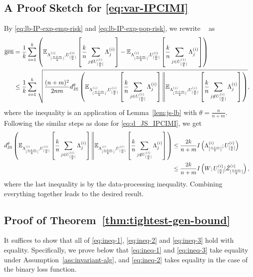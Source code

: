 \documentclass[onecolumn,romanappendices,10pt]{IEEEtran}
\newcommand{\EE}{{\mathbb{E}}}
\DeclareMathOperator{\gen}{\overline{gen}}
\begin{document}
	\subsection{A Proof Sketch for \eqref{eq:var-IPCIMI}} \label{subapp:var-IPCIMI}
	By \eqref{eq:lb-IP-exp-emp-risk} and \eqref{eq:lb-IP-exp-pop-risk}, we rewrite $\gen$ as
	\begin{equation}
		\begin{aligned}
			\gen &= \frac{1}{k} \sum_{i=1}^k \left( \EE_{\Lambda^{(i)}_{[\frac{n+m}{k}]}, U^{(i)}_{[\frac{n}{k}]}} \left[ \frac{k}{n} \sum_{j \not\in U^{(i)}_{[\frac{n}{k}]}} \Lambda^{(i)}_j \right] - \EE_{\Lambda^{(i)}_{[\frac{n+m}{k}]}, U^{(i)}_{[\frac{n}{k}]}} \left[ \frac{k}{n} \sum_{j \in U^{(i)}_{[\frac{n}{k}]}} \Lambda^{(i)}_j \right] \right) \\
			&\leq \frac{1}{k} \sum_{i=1}^k \sqrt{\frac{(n+m)^2}{2nm} d^\theta_{\textnormal{JS}} \left( \EE_{\Lambda^{(i)}_{[\frac{n+m}{k}]}, U^{(i)}_{[\frac{n}{k}]}} \left[ \frac{k}{n} \sum_{j \in U^{(i)}_{[\frac{n}{k}]}} \Lambda^{(i)}_j \right] \left\| \EE_{\Lambda^{(i)}_{[\frac{n+m}{k}]}, U^{(i)}_{[\frac{n}{k}]}} \left[ \frac{k}{n} \sum_{j \not\in U^{(i)}_{[\frac{n}{k}]}} \Lambda^{(i)}_j \right] \right. \right)},
		\end{aligned}
	\end{equation}
	where the inequality is an application of Lemma~\ref{lem:js-lb} with $\theta = \frac{n}{n+m}$. Following the similar steps as done for \eqref{eq:d_JS_IPCIMI}, we get
	\begin{equation}
		\begin{aligned}
			d^\theta_{\textnormal{JS}} \left( \EE_{\Lambda^{(i)}_{[\frac{n+m}{k}]}, U^{(i)}_{[\frac{n}{k}]}} \left[ \frac{k}{n} \sum_{j \in U^{(i)}_{[\frac{n}{k}]}} \Lambda^{(i)}_j \right] \left\| \EE_{\Lambda^{(i)}_{[\frac{n+m}{k}]}, U^{(i)}_{[\frac{n}{k}]}} \left[ \frac{k}{n} \sum_{j \not\in U^{(i)}_{[\frac{n}{k}]}} \Lambda^{(i)}_j \right] \right. \right) &\leq \frac{2k}{n+m} I\left( \Lambda^{(i)}_{[\frac{n+m}{k}]} ;  U^{(i)}_{[\frac{n}{k}]} \right) \\
			&\leq \frac{2k}{n+m} I\left( W ;  U^{(i)}_{[\frac{n}{k}]} | \hat{Z}^{(i)}_{[\frac{n+m}{k}]} \right),
		\end{aligned}
	\end{equation}
	where the last inequality is by the data-processing inequality. Combining everything together leads to the desired result.
	
	\subsection{Proof of Theorem~\ref{thm:tightest-gen-bound}}\label{subapp:tightest-gen-bound}
	It suffices to show that all of \eqref{eq:ineq-1}, \eqref{eq:ineq-2} and \eqref{eq:ineq-3} hold with equality. Specifically, we prove below that \eqref{eq:ineq-1} and \eqref{eq:ineq-3} take equality under Assumption~\ref{ass:invariant-alg}, and \eqref{eq:ineq-2} takes equality in the case of the binary loss function.
	
\end{document}
